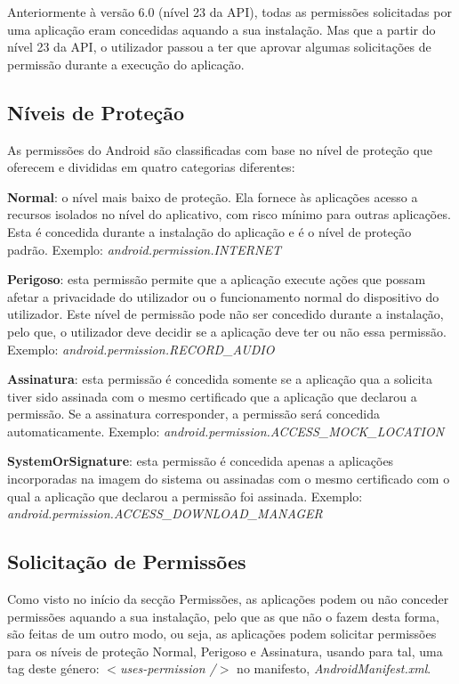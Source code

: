 \documentclass{article}
\begin{document}
Anteriormente à versão 6.0 (nível 23 da API), todas as permissões solicitadas por uma aplicação eram concedidas aquando a sua instalação. Mas que a partir do nível 23 da API, o utilizador passou a ter que aprovar algumas solicitações de permissão durante a execução do aplicação.


\subsection{Níveis de Proteção}
As permissões do Android são classificadas com base no nível de proteção que oferecem e divididas em quatro categorias diferentes:

\textbf{Normal}: o nível mais baixo de proteção. Ela fornece às aplicações acesso a recursos isolados no nível do aplicativo, com risco mínimo para outras aplicações. Esta é concedida durante a instalação do aplicação e é o nível de proteção padrão.
Exemplo: \textit{android.permission.INTERNET}

\textbf{Perigoso}: esta permissão permite que a aplicação execute ações que possam afetar a privacidade do utilizador ou o funcionamento normal do dispositivo do utilizador. Este nível de permissão pode não ser concedido durante a instalação, pelo que, o utilizador deve decidir se a aplicação deve ter ou não essa permissão.
Exemplo: \textit{android.permission.RECORD\_AUDIO}

\textbf{Assinatura}: esta permissão é concedida somente se a aplicação qua a solicita tiver sido assinada com o mesmo certificado que a aplicação que declarou a permissão. Se a assinatura corresponder, a permissão será concedida automaticamente.
Exemplo: \textit{android.permission.ACCESS\_MOCK\_LOCATION}

\textbf{SystemOrSignature}: esta permissão é concedida apenas a aplicações incorporadas na imagem do sistema ou assinadas com o mesmo certificado com o qual a aplicação que declarou a permissão foi assinada.
Exemplo: \textit{android.permission.ACCESS\_DOWNLOAD\_MANAGER}


\subsection{Solicitação de Permissões}
Como visto no início da secção Permissões, as aplicações podem ou não conceder permissões aquando a sua instalação, pelo que as que não o fazem desta forma, são feitas de um outro modo, ou seja, as aplicações podem solicitar permissões para os níveis de proteção Normal, Perigoso e Assinatura, usando para tal, uma tag deste género: \textit{$<$uses-permission /$>$} no manifesto, \textit{AndroidManifest.xml}.
\end{document}
